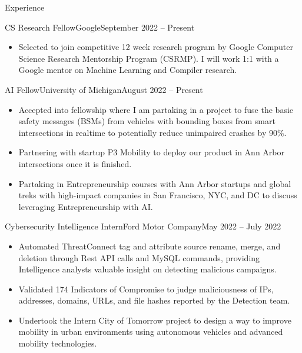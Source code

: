 \documentclass[]{mcdowellcv}
\begin{document}
	\begin{cvsection}{Experience}
		\begin{cvsubsection}{CS Research Fellow}{Google}{September 2022 -- Present}
			\small{
				\begin{itemize}
					\item Selected to join competitive 12 week research program by Google Computer Science Research Mentorship Program (CSRMP). I will work 1:1 with a Google mentor on Machine Learning and Compiler research.
				\end{itemize}
			}
		\end{cvsubsection}

		\begin{cvsubsection}{AI Fellow}{University of Michigan}{August 2022 -- Present}
			\small{
				\begin{itemize}
					\item Accepted into fellowship where I am partaking in a project to fuse the basic safety messages (BSMs) from vehicles with bounding boxes from smart intersections in realtime to potentially reduce unimpaired crashes by 90\%.
					\item Partnering with startup P3 Mobility to deploy our product in Ann Arbor intersections once it is finished.
					\item Partaking in Entrepreneurship courses with Ann Arbor startups and global treks with high-impact companies in San Francisco, NYC, and DC to discuss leveraging Entrepreneurship with AI.
				\end{itemize}
			}
		\end{cvsubsection}
		
		\begin{cvsubsection}{Cybersecurity Intelligence Intern}{Ford Motor Company}{May 2022 -- July 2022}
			\small{
				\begin{itemize}
					\item Automated ThreatConnect tag and attribute source rename, merge, and deletion through Rest API calls and MySQL commands, providing Intelligence analysts valuable insight on detecting malicious campaigns.
					\item Validated 174 Indicators of Compromise to judge maliciousness of IPs, addresses, domains, URLs, and file hashes reported by the Detection team.
					\item Undertook the Intern City of Tomorrow project to design a way to improve mobility in urban environments using autonomous vehicles and advanced mobility technologies.
				\end{itemize}
			}
		\end{cvsubsection}
		

\end{cvsection}
\end{document}
